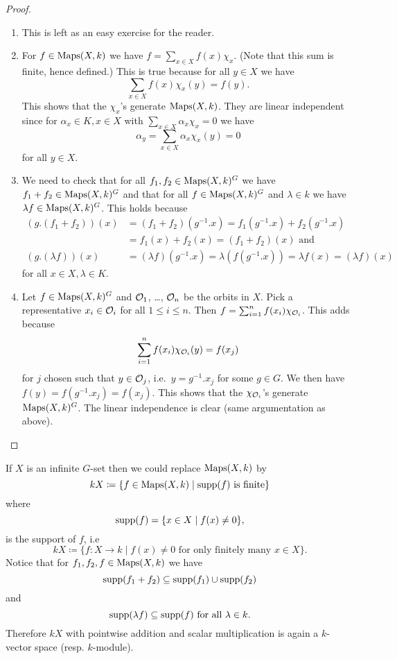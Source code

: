 \begin{proof}
 \begin{enumerate}[label=\emph{\alph*})]
  \item
   This is left as an easy exercise for the reader.
  \item
   For $f \in \operatorname{Maps}(X,k)$ we have $f = \sum_{x \in X} f(x) \chi_x$. (Note that this sum is finite, hence defined.) This is true because for all $y \in X$ we have
   \[
    \sum_{x \in X} f(x) \chi_x(y) = f(y).
   \]
   This shows that the $\chi_x$'s generate $\operatorname{Maps}(X,k)$. They are linear independent since for $\alpha_x \in K, x \in X$ with $\sum_{x \in X} \alpha_x \chi_x = 0$ we have
   \[
    \alpha_y = \sum_{x \in X} \alpha_x \chi_x(y) = 0
   \]
   for all $y \in X$.
  \item
   We need to check that for all $f_1, f_2 \in \operatorname{Maps}(X,k)^G$ we have $f_1+f_2 \in \operatorname{Maps}(X,k)^G$ and that for all $f \in \operatorname{Maps}(X,k)^G$ and $\lambda \in k$ we have $\lambda f \in \operatorname{Maps}(X,k)^G$. This holds because
   \begin{align*}
    (g.(f_1+f_2))(x)
    &= (f_1+f_2)(g^{-1}.x) = f_1(g^{-1}.x) + f_2(g^{-1}.x) \\
    &= f_1(x) + f_2(x) = (f_1+f_2)(x) \text{ and} \\
    (g.(\lambda f))(x)
    &= (\lambda f)(g^{-1}.x) = \lambda (f(g^{-1}.x)) = \lambda f(x) = (\lambda f)(x)
   \end{align*}
   for all $x \in X, \lambda \in K$.
  \item
   Let $f \in \operatorname{Maps}(X,k)^G$ and $\mathcal{O}_1$, \dots, $\mathcal{O}_n$ be the orbits in $X$. Pick a representative $x_i \in \mathcal{O}_i$ for all $1 \leq i \leq n$. Then $f = \sum_{i=1}^n f(x_i) \chi_{\mathcal{O}_i}$. This adds because
   \[
    \sum_{i=1}^n f(x_i) \chi_{\mathcal{O}_i}(y) = f(x_j)
   \]
   for $j$ chosen such that $y \in \mathcal{O}_j$, i.e.\ $y = g^{-1}.x_j$ for some $g \in G$. We then have $f(y) = f(g^{-1}.x_j) = f(x_j)$. This shows that the $\chi_{\mathcal{O}_i}$’s generate $\operatorname{Maps}(X,k)^G$. The linear independence is clear (same argumentation as above).
 \end{enumerate}
\end{proof}


If $X$ is an infinite $G$-set then we could replace $\operatorname{Maps}(X,k)$ by
\[
 kX \coloneqq \{f \in \operatorname{Maps}(X,k) \mid \operatorname{supp}(f) \text{ is finite}\}
\]
where
\[
 \operatorname{supp}(f) = \{x \in X \mid f(x) \neq 0\},
\]
is the support of $f$, i.e
\[
 kX \coloneqq \{f \colon X \to k \mid f(x) \neq 0 \text{ for only finitely many } x \in X\}.
\]
Notice that for $f_1, f_2, f \in \operatorname{Maps}(X,k)$ we have
\[
 \operatorname{supp}(f_1+f_2) \subseteq \operatorname{supp}(f_1) \cup \operatorname{supp}(f_2)
\]
and
\[
 \operatorname{supp}(\lambda f) \subseteq \operatorname{supp}(f) \text{ for all } \lambda \in k.
\]
Therefore $kX$ with pointwise addition and scalar multiplication is again a $k$-vector space (resp. $k$-module).

